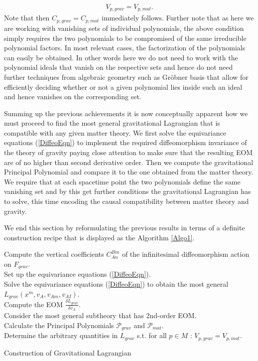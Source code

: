 \begin{align}
    V_{p,grav} = V_{p,mat}.
\end{align}
Note that then $C_{p,grav} = C_{p,mat}$ immediately follows. Further note that as here we are working with vanishing sets of individual polynomials, the above condition simply requires the two polynomials to be compromised of the same irreducible polynomial factors. In most relevant cases, the factorization of the polynomials can easily be obtained. In other words here we do not need to work with the polynomial ideals that vanish on the respective sets and hence do not need further techniques from algebraic geometry such as Gröbner basis that allow for efficiently deciding whether or not a given polynomial lies inside such an ideal and hence vanishes on the corresponding set.  

Summing up the previous achievements it is now conceptually apparent how we must proceed to find the most general gravitational Lagrangian that is compatible with any given matter theory. We first solve the equivariance equations (\ref{DiffeoEqn}) to implement the required diffeomorphism invariance of the theory of gravity paying close attention to make sure that the resulting EOM are of no higher than second derivative order. Then we compute the gravitational Principal Polynomial and compare it to the one obtained from the matter theory. We require that at each spacetime point the two polynomials define the same vanishing set and by this get further conditions the gravitational Lagrangian has to solve, this time encoding the causal compatibility between matter theory and gravity.

We end this section by reformulating the previous results in terms of a definite construction recipe that is displayed as the Algorithm \ref{Algo1}.
\begin{algorithm}[hbt!]
\SetAlgoLined
{}
Compute the vertical coefficients $C^{Bm}_{An}$ of the infinitesimal diffeomorphism action on $F_{grav}$. \\
Set up the equivariance equations (\ref{DiffeoEqn}). \\
Solve the equivariance equations (\ref{DiffeoEqn}) to obtain the most general $L_{grav}(x^m,v_A,v_{Am},v_{AI})$.\\
Compute the EOM $\frac{\delta L_{grav}}{\delta v_A}$.\\
Consider the most general subtheory that has 2nd-order EOM.\\
Calculate the Principal Polynomials $\mathcal{P}_{grav}$ and $\mathcal{P}_{mat}$.\\
Determine the arbitrary quantities in $L_{grav}$ s.t. for all $p \in M$ : $V_{p,grav} = V_{p,mat}.$
 \caption{Construction of Gravitational Lagrangian}\label{Algo1}
\end{algorithm}
